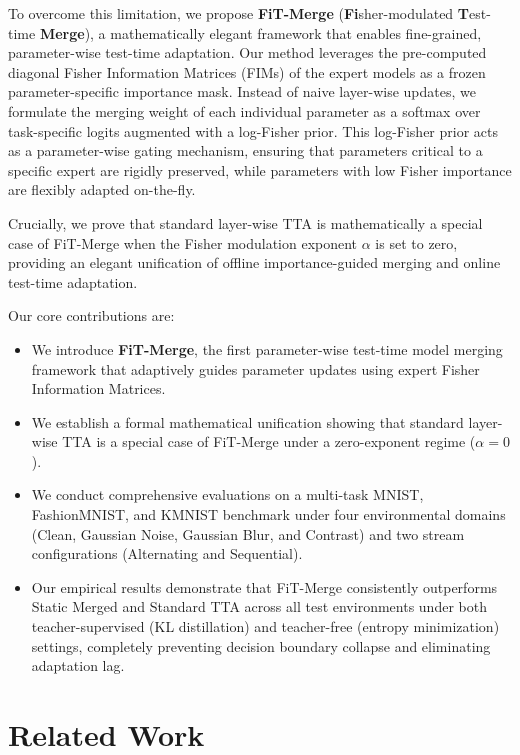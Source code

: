\documentclass{article}
\theoremstyle{plain}
\theoremstyle{definition}
\theoremstyle{remark}
\begin{document}
To overcome this limitation, we propose \textbf{FiT-Merge} (\textbf{Fi}sher-modulated \textbf{T}est-time \textbf{Merge}), a mathematically elegant framework that enables fine-grained, parameter-wise test-time adaptation. Our method leverages the pre-computed diagonal Fisher Information Matrices (FIMs) of the expert models as a frozen parameter-specific importance mask. Instead of naive layer-wise updates, we formulate the merging weight of each individual parameter as a softmax over task-specific logits augmented with a log-Fisher prior. This log-Fisher prior acts as a parameter-wise gating mechanism, ensuring that parameters critical to a specific expert are rigidly preserved, while parameters with low Fisher importance are flexibly adapted on-the-fly.

Crucially, we prove that standard layer-wise TTA is mathematically a special case of FiT-Merge when the Fisher modulation exponent $\alpha$ is set to zero, providing an elegant unification of offline importance-guided merging and online test-time adaptation.

Our core contributions are:
\begin{itemize}
  \item We introduce \textbf{FiT-Merge}, the first parameter-wise test-time model merging framework that adaptively guides parameter updates using expert Fisher Information Matrices.
  \item We establish a formal mathematical unification showing that standard layer-wise TTA is a special case of FiT-Merge under a zero-exponent regime ($\alpha = 0$).
  \item We conduct comprehensive evaluations on a multi-task MNIST, FashionMNIST, and KMNIST benchmark under four environmental domains (Clean, Gaussian Noise, Gaussian Blur, and Contrast) and two stream configurations (Alternating and Sequential).
  \item Our empirical results demonstrate that FiT-Merge consistently outperforms Static Merged and Standard TTA across all test environments under both teacher-supervised (KL distillation) and teacher-free (entropy minimization) settings, completely preventing decision boundary collapse and eliminating adaptation lag.
\end{itemize}

\section{Related Work}
\label{sec:related}
\end{document}
